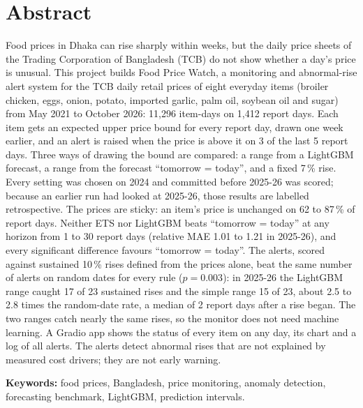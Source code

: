 \chapter*{Abstract}
Food prices in Dhaka can rise sharply within weeks, but the daily price sheets of the Trading Corporation of Bangladesh (TCB) do not show whether a day's price is unusual. This project builds Food Price Watch, a monitoring and abnormal-rise alert system for the TCB daily retail prices of eight everyday items (broiler chicken, eggs, onion, potato, imported garlic, palm oil, soybean oil and sugar) from May 2021 to October 2026: 11,296 item-days on 1,412 report days. Each item gets an expected upper price bound for every report day, drawn one week earlier, and an alert is raised when the price is above it on 3 of the last 5 report days. Three ways of drawing the bound are compared: a range from a LightGBM forecast, a range from the forecast ``tomorrow = today'', and a fixed 7\,\% rise. Every setting was chosen on 2024 and committed before 2025-26 was scored; because an earlier run had looked at 2025-26, those results are labelled retrospective. The prices are sticky: an item's price is unchanged on 62 to 87\,\% of report days. Neither ETS nor LightGBM beats ``tomorrow = today'' at any horizon from 1 to 30 report days (relative MAE 1.01 to 1.21 in 2025-26), and every significant difference favours ``tomorrow = today''. The alerts, scored against sustained 10\,\% rises defined from the prices alone, beat the same number of alerts on random dates for every rule ($p = 0.003$): in 2025-26 the LightGBM range caught 17 of 23 sustained rises and the simple range 15 of 23, about 2.5 to 2.8 times the random-date rate, a median of 2 report days after a rise began. The two ranges catch nearly the same rises, so the monitor does not need machine learning. A Gradio app shows the status of every item on any day, its chart and a log of all alerts. The alerts detect abnormal rises that are not explained by measured cost drivers; they are not early warning.

\textbf{Keywords:} food prices, Bangladesh, price monitoring, anomaly detection, forecasting benchmark, LightGBM, prediction intervals.
